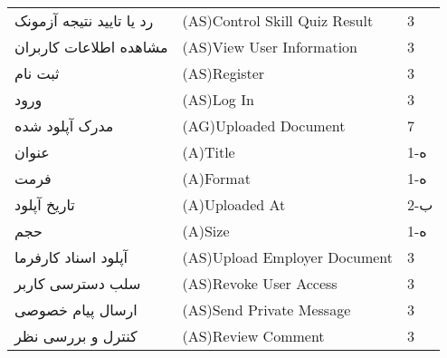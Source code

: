 \documentclass[12pt]{article}
\begin{document}
\begin{table}[]
\begin{tabular}{lll}
			رد یا تایید نتیجه آزمونک             & (AS)Control Skill Quiz Result                                                                                 & 3     \\
			مشاهده اطلاعات کاربران               & (AS)View User Information                                                                                     & 3     \\
			ثبت نام                              & (AS)Register                                                                                                  & 3     \\
			ورود                                 & (AS)Log In                                                                                                    & 3     \\
			مدرک آپلود شده                       & (AG)Uploaded Document                                                                                         & 7     \\
			عنوان                                & (A)Title                                                                                                      & 1-ه   \\
			فرمت                                 & (A)Format                                                                                                     & 1-ه   \\
			تاریخ آپلود                          & (A)Uploaded At                                                                                                & 2-ب   \\
			حجم                                  & (A)Size                                                                                                       & 1-ه   \\
			آپلود اسناد کارفرما                  & (AS)Upload Employer Document                                                                                  & 3     \\
			سلب دسترسی کاربر                     & (AS)Revoke User Access                                                                                        & 3     \\
			ارسال پیام خصوصی                     & (AS)Send Private Message                                                                                      & 3     \\
			کنترل و بررسی نظر                    & (AS)Review Comment                                                                                            & 3     \\

\end{tabular}
\end{table}
\end{document}

